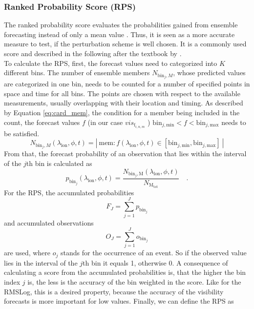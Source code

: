 \subsubsection{Ranked Probability Score (RPS)}
The ranked probability score evaluates the probabilities gained from ensemble forecasting instead of only a mean value \cite{buizza1998impact}. Thus,  it is seen as a more accurate measure to test, if the perturbation scheme is well chosen. It is a commonly used score and described in the following after the textbook by \citeauthor{wilks2011statistical} \cite{wilks2011statistical}.\\
To calculate the RPS, first, the forecast values need to categorized into $K$ different bins. The number of ensemble members $N_{\mathrm{bin}_{j},M}$, whose predicted values are categorized in one bin, needs to be counted for a number of specified points in space and time for all bins. The points are chosen with respect to the available measurements, usually overlapping with their location and timing. As described by Equation \eqref{eq:card_mem}, the condition for a member being included in the count, the forecast values $f$ (in our case $vis_{\mathrm{f}_{i,n,m}}$ ) $\mathrm{bin}_{j,\mathrm{min}} < f < \mathrm{bin}_{j,\mathrm{max}}$ needs to be satisfied.
\begin{equation}
    N_{\mathrm{bin}_{j},M}(\lambda_{\mathrm{lon}}, \phi, t) = | \ \mathrm{mem} : f (\lambda_{\mathrm{lon}}, \phi, t) \in [\mathrm{bin}_{j,\mathrm{min}}, \mathrm{bin}_{j,\mathrm{max}}] \ |
    \label{eq:card_mem}
\end{equation}
From that, the forecast probability of an observation that lies within the interval of the $j$th bin is calculated as
\begin{equation}
 p_{\mathrm{bin}_{j}}(\lambda_{\mathrm{lon}}, \phi, t) = \frac{ N_{\mathrm{bin}_{j},\mathrm{M}} (\lambda_{\mathrm{lon}}, \phi, t)}{ N_{\mathrm{M_{tot}}}} \quad .
\end{equation}
For the RPS, the accumulated probabilities
\begin{equation}
 F_{J}=\sum_{j=1}^{J}  p_{\mathrm{bin}_{j}}
\end{equation}
and accumulated observations
\begin{equation}
 O_{J}=\sum_{j=1}^{J}  o_{\mathrm{bin}_{j}}
\end{equation}
 are used, where $o_{j}$ stands for the occurrence of an event. So if the observed value lies in the interval of the $j$th bin it equals 1, otherwise 0. A consequence of calculating a score from the accumulated probabilities is, that the higher the bin index $j$ is, the less is the accuracy of the bin weighted in the score. Like for the RMSLog, this is a desired property, because the accuracy of the visibility forecasts is more important for low values. Finally, we can define the RPS as
